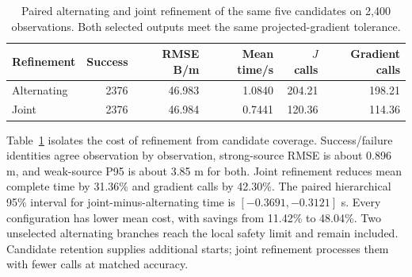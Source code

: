 \documentclass[a4paper,fleqn,review]{cas-sc}
\begin{document}
\begin{table}[pos=H]\centering\small
\caption{Paired alternating and joint refinement of the same five candidates on 2,400 observations. Both selected outputs meet the same projected-gradient tolerance.}\label{en:apjoint}
\begin{tabular}{@{}lrrrrr@{}}\toprule
Refinement & Success & RMSE B/m & Mean time/s & $J$ calls & Gradient calls\\\midrule
Alternating & 2376 & 46.983 & 1.0840 & 204.21 & 198.21\\
Joint & 2376 & 46.984 & 0.7441 & 120.36 & 114.36\\\bottomrule
\end{tabular}\end{table}
Table~\ref{en:apjoint} isolates the cost of refinement from candidate coverage. Success/failure identities agree observation by observation, strong-source RMSE is about 0.896 m, and weak-source P95 is about 3.85 m for both. Joint refinement reduces mean complete time by 31.36\% and gradient calls by 42.30\%. The paired hierarchical 95\% interval for joint-minus-alternating time is $[-0.3691,-0.3121]$ s. Every configuration has lower mean cost, with savings from 11.42\% to 48.04\%. Two unselected alternating branches reach the local safety limit and remain included. Candidate retention supplies additional starts; joint refinement processes them with fewer calls at matched accuracy.

\FloatBarrier
\end{document}

